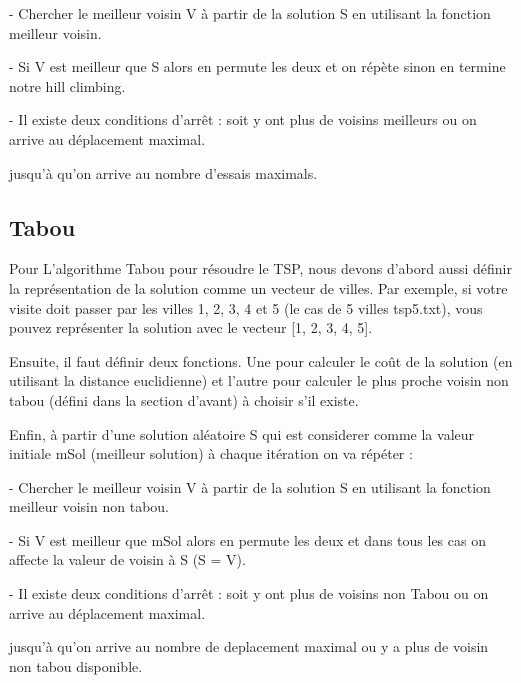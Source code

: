 \documentclass[12pt]{article}
\begin{document}
                \hspace{0.6cm}- Chercher le meilleur voisin V à partir de la solution S en utilisant la fonction meilleur voisin.

                \hspace{0.6cm}- Si V est meilleur que S alors en permute les deux et on répète sinon en termine notre hill climbing.

                \hspace{0.6cm}- Il existe deux conditions d'arrêt : soit y ont plus de voisins meilleurs ou on arrive au déplacement maximal.
                
                jusqu'à qu'on arrive au nombre d'essais maximals.\\
                
            \subsection{Tabou}
                Pour L'algorithme Tabou pour résoudre le TSP, nous devons d'abord  aussi définir la représentation de la solution comme un vecteur de villes. Par exemple, si votre visite doit passer par les villes 1, 2, 3, 4 et 5 (le cas de 5 villes tsp5.txt), vous pouvez représenter la solution avec le vecteur [1, 2, 3, 4, 5].

                Ensuite, il faut définir deux fonctions. Une pour calculer le coût de la solution (en utilisant la distance euclidienne) et l'autre pour calculer le plus proche voisin non tabou (défini dans la section d'avant) à choisir s'il existe.

                Enfin, à partir d'une solution aléatoire S  qui est considerer comme la valeur initiale mSol (meilleur solution) à chaque itération on va répéter :

                \hspace{0.6cm}- Chercher le meilleur voisin V à partir de la solution S en utilisant la fonction meilleur voisin non tabou.

                \hspace{0.6cm}- Si V est meilleur que mSol alors en permute les deux et dans tous les cas on affecte la valeur de voisin à S (S = V).

                \hspace{0.6cm}- Il existe deux conditions d'arrêt : soit y ont plus de voisins non Tabou ou on arrive au déplacement maximal.
                
                jusqu'à qu'on arrive au nombre de deplacement maximal ou y a plus de voisin non tabou disponible.\\
\end{document}
